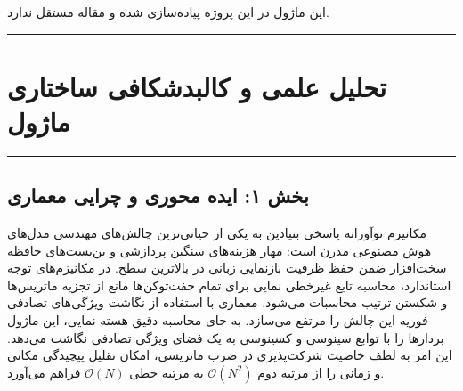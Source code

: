 \clearpage
{}
\vspace*{0.2cm}

این ماژول در این پروژه پیاده‌سازی شده و مقاله مستقل ندارد.
\noindent\rule{\textwidth}{1.2pt}
\vspace*{0.1cm}
\section{تحلیل علمی و کالبدشکافی ساختاری ماژول }
\label{sec:mod_leka_v1}
\vspace*{-0.2cm}
\noindent\rule{\textwidth}{0.5pt}
\vspace*{0.3cm}

\subsection*{بخش ۱: ایده محوری و چرایی معماری }
مکانیزم نوآورانه   پاسخی بنیادین به یکی از حیاتی‌ترین چالش‌های مهندسی مدل‌های هوش مصنوعی مدرن است: مهار هزینه‌های سنگین پردازشی و بن‌بست‌های حافظه سخت‌افزار ضمن حفظ ظرفیت بازنمایی زبانی در بالاترین سطح.
در مکانیزم‌های توجه استاندارد، محاسبه تابع غیرخطی نمایی برای تمام جفت‌توکن‌ها مانع از تجزیه ماتریس‌ها و شکستن ترتیب محاسبات می‌شود. معماری  با استفاده از نگاشت ویژگی‌های تصادفی فوریه  این چالش را مرتفع می‌سازد. به جای محاسبه دقیق هسته نمایی، این ماژول بردارها را با توابع سینوسی و کسینوسی به یک فضای ویژگی تصادفی نگاشت می‌دهد. این امر به لطف خاصیت شرکت‌پذیری در ضرب ماتریسی، امکان تقلیل پیچیدگی مکانی و زمانی را از مرتبه دوم $\mathcal{O}(N^2)$ به مرتبه خطی $\mathcal{O}(N)$ فراهم می‌آورد.

